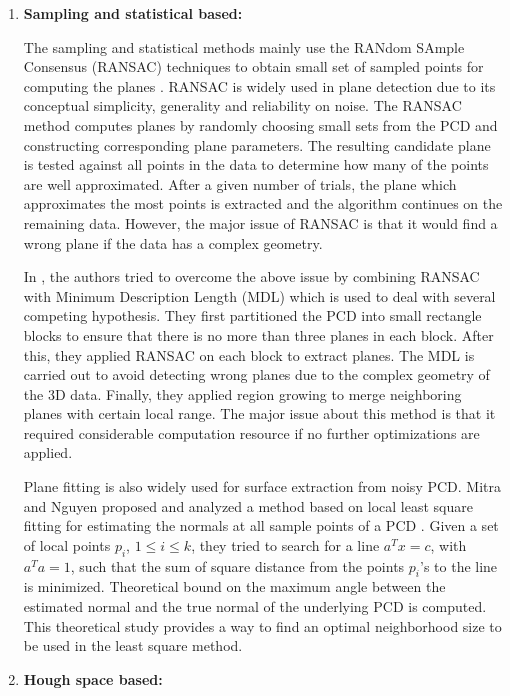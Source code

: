 \begin{enumerate}

\item {\bf Sampling and statistical based:}

The sampling and statistical methods mainly use
the RANdom SAmple Consensus (RANSAC) techniques \cite{RANSAC}
to obtain small set of sampled points for
computing the planes \cite{NE_PVBP,NE_SWK,book_fp}.
RANSAC is widely used in plane detection due to its conceptual simplicity,
generality and reliability on noise.
The RANSAC method computes planes by randomly choosing small sets from
the PCD and constructing corresponding plane parameters.
The resulting candidate plane is tested against all points in the data
to determine how many of the points are well approximated.
After a given number of trials, the plane which approximates the most
points is extracted and the algorithm continues on the remaining data.
However, the major issue of RANSAC is that it would find a wrong plane
if the data has a complex geometry.

In \cite{NE_YF}, the authors tried to overcome the above issue by combining
RANSAC with Minimum Description Length (MDL) which is used to deal with
several competing hypothesis.
They first partitioned the PCD into small rectangle blocks
to ensure that there is no more than three planes in each block.
After this, they applied RANSAC on each block to extract planes.
The MDL is carried out to avoid detecting wrong planes
due to the complex geometry of the 3D data.
Finally, they applied region growing
to merge neighboring planes with certain local range.
The major issue about this method is that it required considerable
computation resource if no further optimizations are applied.

Plane fitting is also widely used for surface extraction from noisy PCD.
Mitra and Nguyen proposed and analyzed a method based on
local least square fitting for estimating the normals
at all sample points of a PCD \cite{NE_MN}.
Given a set of local points $p_i$, $1 \le i \le k$,
they tried to search for a line $a^Tx = c$, with $a^Ta = 1$,
such that the sum of square distance
from the points $p_i$'s to the line is minimized.
Theoretical bound on the maximum angle between the estimated normal
and the true normal of the underlying PCD is computed.
This theoretical study provides a way to find an optimal neighborhood size
to be used in the least square method.

\item { \bf Hough space based:}


\end{enumerate}
